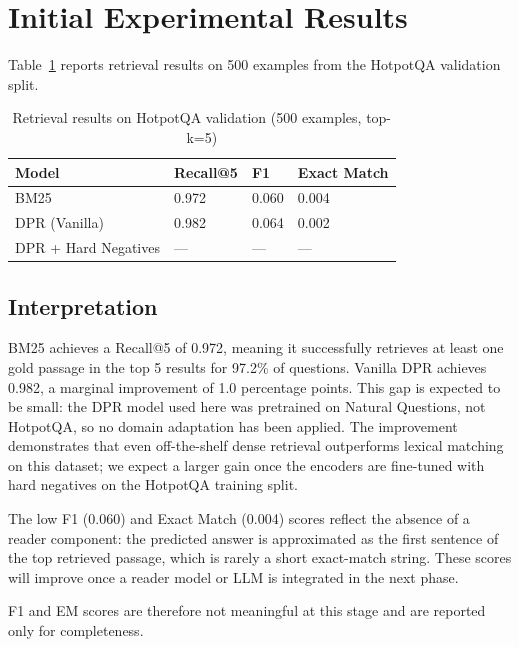 \documentclass[12pt,a4paper]{article}
\begin{document}
\section{Initial Experimental Results}

Table~\ref{tab:results} reports retrieval results on 500 examples from the
HotpotQA validation split.

\begin{table}[h]
\centering
\begin{tabular}{llll}
\toprule
\textbf{Model} & \textbf{Recall@5} & \textbf{F1} & \textbf{Exact Match} \\
\midrule
BM25                    & 0.972 & 0.060 & 0.004 \\
DPR (Vanilla)           & 0.982 & 0.064 & 0.002 \\
DPR + Hard Negatives    & —     & —     & —     \\
\bottomrule
\end{tabular}
\caption{Retrieval results on HotpotQA validation (500 examples, top-k=5)}
\label{tab:results}
\end{table}


\subsection*{Interpretation}

BM25 achieves a Recall@5 of 0.972, meaning it successfully retrieves at least one
gold passage in the top 5 results for 97.2\% of questions. Vanilla DPR achieves
0.982, a marginal improvement of 1.0 percentage points. This gap is expected to be
small: the DPR model used here was pretrained on Natural Questions, not HotpotQA,
so no domain adaptation has been applied. The improvement demonstrates that even
off-the-shelf dense retrieval outperforms lexical matching on this dataset; we
expect a larger gain once the encoders are fine-tuned with hard negatives on the
HotpotQA training split.

The low F1 (0.060) and Exact Match (0.004) scores reflect the absence of a reader
component: the predicted answer is approximated as the first sentence of the top
retrieved passage, which is rarely a short exact-match string. These scores will
improve once a reader model or LLM is integrated in the next phase.

F1 and EM scores are therefore not meaningful at this stage and are reported only
for completeness.

\end{document}
